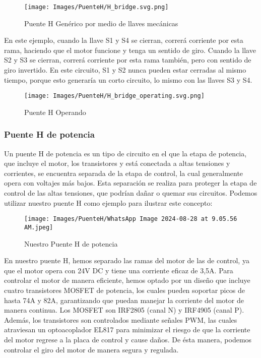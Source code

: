 \documentclass{article}
\begin{document}
\begin{figure}[H]
    \centering
    \texttt{[image: Images/PuenteH/H\_bridge.svg.png]}
    \caption{Puente H Genérico por medio de llaves mecánicas}
\end{figure}

En este ejemplo, cuando la llave S1 y S4 se cierran, correrá corriente por esta rama, haciendo que el motor funcione y tenga un sentido de giro. Cuando la llave S2 y S3 se cierran, correrá corriente por esta rama también, pero con sentido de giro invertido. En este circuito, S1 y S2 nunca pueden estar cerradas al mismo tiempo, porque esto generaría un corto circuito, lo mismo con las llaves S3 y S4.

\begin{figure}[H]
    \centering
    \texttt{[image: Images/PuenteH/H\_bridge\_operating.svg.png]}
    \caption{Puente H Operando}
\end{figure}

\subsubsection{Puente H de potencia}
Un puente H de potencia es un tipo de circuito en el que la etapa de potencia, que incluye el motor, los transistores y está conectada a altas tensiones y corrientes, se encuentra separada de la etapa de control, la cual generalmente opera con voltajes más bajos. Esta separación se realiza para proteger la etapa de control de las altas tensiones, que podrían dañar o quemar sus circuitos. Podemos utilizar nuestro puente H como ejemplo para ilustrar este concepto:

 \begin{figure}[H]
     \centering
     \texttt{[image: Images/PuenteH/WhatsApp Image 2024-08-28 at 9.05.56 AM.jpeg]}
     \caption{Nuestro Puente H de potencia}
     \label{fig:enter-label}
 \end{figure}

En nuestro puente H, hemos separado las ramas del motor de las de control, ya que el motor opera con 24V DC y tiene una corriente eficaz de 3,5A. Para controlar el motor de manera eficiente, hemos optado por un diseño que incluye cuatro transistores MOSFET de potencia, los cuales pueden soportar picos de hasta 74A y 82A, garantizando que puedan manejar la corriente del motor de manera continua. Los MOSFET son IRF2805 (canal N) y IRF4905 (canal P). Además, los transistores son controlados mediante señales PWM, las cuales atraviesan un optoacoplador EL817 para minimizar el riesgo de que la corriente del motor regrese a la placa de control y cause daños. De ésta manera, podemos controlar el giro del motor de manera segura y regulada. 
\end{document}
